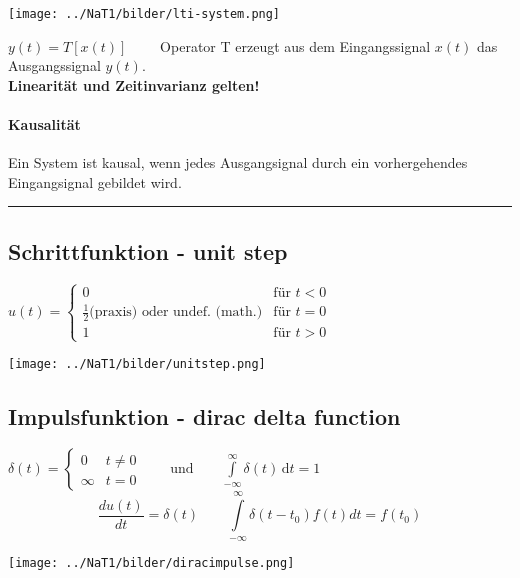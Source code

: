 \begin{center}
	\texttt{[image: ../NaT1/bilder/lti-system.png]}
\end{center}


$ y(t) = T [ x(t)] \qquad $ Operator T erzeugt aus dem Eingangssignal $ x(t) $ das Ausgangssignal $ y(t)$. \\
\textbf{Linearität und Zeitinvarianz gelten!}

\paragraph{Kausalität} Ein System ist kausal, wenn jedes Ausgangsignal durch ein vorhergehendes Eingangsignal gebildet wird.
\\
\hrule
\subsection{Schrittfunktion - unit step}
\begin{minipage}{10cm}
	$u(t) =	\begin{cases}
	  		 0 & \text{für } t < 0 \\
	  		 \frac{1}{2} \text{(praxis)}  \text{ oder undef. (math.)} & \text{für } t = 0 \\
	  		 1 & \text{für } t > 0
	  	\end{cases}
	$
\end{minipage}
\begin{minipage}{8cm}
	\texttt{[image: ../NaT1/bilder/unitstep.png]}
\end{minipage}


\subsection{Impulsfunktion - dirac delta function}
	\begin{minipage}{10cm}
		$\delta (t)=\begin{cases} 0 & t\ne 0\\\infty & t=0\end{cases} \qquad
		\text{und} \qquad \int\limits_{-\infty}^\infty \delta(t) \, \mathrm dt = 1 $\\
		$$\frac{du(t)}{dt}=\delta(t) \qquad
		\int\limits_{-\infty}^{\infty}\delta(t-t_0)f(t)dt=f(t_0)$$
	\end{minipage}
	\begin{minipage}{8cm}
		\texttt{[image: ../NaT1/bilder/diracimpulse.png]}
	\end{minipage}

